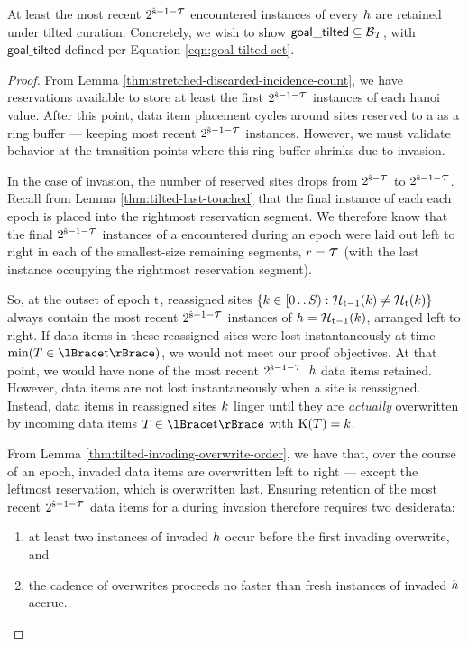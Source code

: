 \begin{lemma}
\label{thm:tilted-most-recent-retained}
At least the most recent $2^{\colors - 1 - \colortau}$ encountered instances of every \hv{} $\colorh$ are retained under tilted curation.
Concretely, we wish to show $\mathsf{goal\_tilted} \subseteq \colorB_{\colorT}$, with $\mathsf{goal\_tilted}$ defined per Equation \ref{eqn:goal-tilted-set}.
\end{lemma}
\begin{proof}
From Lemma \ref{thm:stretched-discarded-incidence-count}, we have reservations available to store at least the first $2^{\colors - 1 - \colortau}$ instances of each hanoi value.
After this point, data item placement cycles around sites reserved to a \hv as a ring buffer --- keeping most recent $2^{\colors - 1 - \colortau}$ instances.
However, we must validate behavior at the transition points where this ring buffer shrinks due to invasion.

In the case of invasion, the number of reserved sites drops from $2^{\colors - \colortau}$ to $2^{\colors - 1 - \colortau}$.
Recall from Lemma \ref{thm:tilted-last-touched} that the final instance of each \hv{} each epoch is placed into the rightmost reservation segment.
We therefore know that the final $2^{\colors - 1 - \colortau}$ instances of a \hv{} encountered during an epoch were laid out left to right in each of the smallest-size remaining segments, $r = \colortau$ (with the last instance occupying the rightmost reservation segment).

So, at the outset of epoch $\colort$, reassigned sites $\{\colork \in [0\twodots\colorS) : \colorHcal_{\colort - 1}(\colork) \neq \colorHcal_{\colort}(\colork)\}$ always contain the most recent $2^{\colors - 1 - \colortau}$ instances of \hv{} $\colorh = \colorHcal_{\colort - 1}(\colork)$, arranged left to right.
If data items in these reassigned sites were lost instantaneously at time $\min(\colorT \in \colortsetofT)$, we would not meet our proof objectives.
At that point, we would have none of the most recent $2^{\colors - 1 - \colortau}$ \hv{} $\colorh$ data items retained.
However, data items are not lost instantaneously when a site is reassigned.
Instead, data items in reassigned sites $\colork$ linger until they are \textit{actually} overwritten by incoming data items $\colorT \in \colortsetofT$ with $\colorK(\colorT) = \colork$.

From Lemma \ref{thm:tilted-invading-overwrite-order}, we have that, over the course of an epoch, invaded data items are overwritten left to right --- except the leftmost reservation, which is overwritten last.
Ensuring retention of the most recent $2^{\colors - 1 - \colortau}$ data items for a \hv{} during invasion therefore requires two desiderata:
\begin{enumerate}
\item at least two instances of invaded \hv{} $\colorh$ occur before the first invading overwrite, and
\item the cadence of overwrites proceeds no faster than fresh instances of invaded \hv{} $\colorh$ accrue.
\end{enumerate}



\end{proof}
